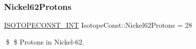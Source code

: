 \subsubsection{\texorpdfstring{Nickel62\+Protons}{Nickel62Protons}}
{\footnotesize\ttfamily \mbox{\hyperlink{group___isotope_const-_macros_ga5f18360b3e99483a35c32d789e62621c}{I\+S\+O\+T\+O\+P\+E\+C\+O\+N\+S\+T\+\_\+\+I\+NT}} Isotope\+Const\+::\+Nickel62\+Protons = 28}

\$ \$ Protons in Nickel-\/62. 